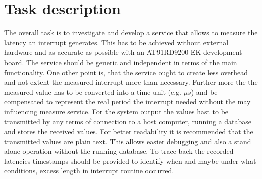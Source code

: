 \chapter{Task description}The overall task is to investigate and develop a service that allows to measure the latency an interrupt generates. This has to be achieved without external hardware and as accurate as possible with an AT91RD9200-EK development board. The service should be generic and independent in terms of the main functionality. One other point is, that the service ought to create less overhead and not extent the measured interrupt more than necessary. Further more the the measured value has to be converted into a time unit (e.g. $\mu s$) and be compensated to represent the real period the interrupt needed without the may influencing measure service. For the system output the values hast to be transmitted by any terms of connection to a host computer, running a database and stores the received values. For better readability it is recommended that the transmitted values are plain text. This allows easier debugging and also a stand alone operation without the running database. To trace back the recorded latencies timestamps should be provided to identify when and maybe under what conditions, excess length in interrupt routine occurred.\\
